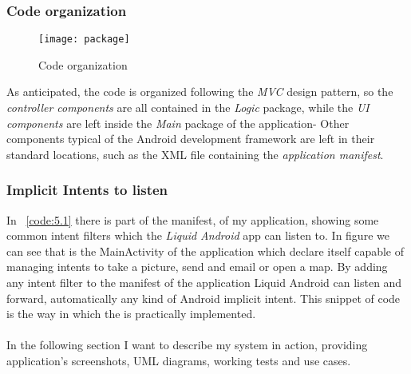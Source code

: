 \subsubsection{Code organization}
\begin{figure}[h]
	\centering
	\texttt{[image: package]}
	\caption{Code organization}
	\label{fig:5.1}
\end{figure}
As anticipated, the code is organized following the \textit{MVC} design pattern, so the \textit{controller components} are all contained in the \textit{Logic} package, while the \textit{UI components} are left inside the \textit{Main} package of the application- Other components typical of the Android development framework are left in their standard locations, such as the XML file containing the \textit{application manifest}.

\subsubsection{Implicit Intents to listen}

In \lstlistingname~\ref{code:5.1} there is part of the manifest, of my application, showing some common intent filters which the \textit{Liquid Android} app can listen to. In figure we can see that is the MainActivity of the application which declare itself capable of managing intents to take a picture, send and email or open a map. By adding any intent filter to the manifest of the application Liquid Android can listen and forward, automatically any kind of Android implicit intent. This snippet of code is the way in which the  is practically implemented.\\\\
In the following section I want to describe my system in action, providing application's screenshots, UML diagrams, working tests and use cases.
